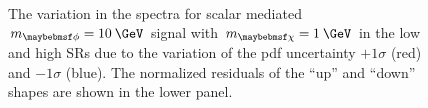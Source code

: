 \begin{figure}[h]
  \centering
   \\
  \caption{The variation in the \ptmiss spectra for scalar mediated $\mMed=10\:\GeV$ signal with $\mDM=1\:\GeV$ in the low and high \mttll SRs due to the variation of the pdf uncertainty $+1\sigma$ (red) and $-1\sigma$ (blue). The normalized residuals of the ``up'' and ``down'' shapes are shown in the lower panel.}
  \label{fig:PDFshape}
\end{figure}

%
